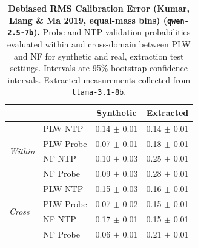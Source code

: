 \begin{table}[ht]
\centering
\begin{tabular}{ll cc}
\toprule
& & Synthetic & Extracted \\
\midrule
\multirow{4}{*}{\textit{Within}}
& PLW NTP & 0.14 $\pm$ 0.01 & 0.14 $\pm$ 0.01 \\
& PLW Probe & 0.07 $\pm$ 0.01 & 0.18 $\pm$ 0.01 \\
& NF NTP & 0.10 $\pm$ 0.03 & 0.25 $\pm$ 0.01 \\
& NF Probe & 0.09 $\pm$ 0.03 & 0.28 $\pm$ 0.01 \\
\midrule
\multirow{4}{*}{\textit{Cross}}
& PLW NTP & 0.15 $\pm$ 0.03 & 0.16 $\pm$ 0.01 \\
& PLW Probe & 0.07 $\pm$ 0.02 & 0.15 $\pm$ 0.01 \\
& NF NTP & 0.17 $\pm$ 0.01 & 0.15 $\pm$ 0.01 \\
& NF Probe & 0.06 $\pm$ 0.01 & 0.21 $\pm$ 0.01 \\
\bottomrule
\end{tabular}
\caption{\textbf{Debiased RMS Calibration Error (Kumar, Liang \& Ma 2019, equal-mass bins) (\texttt{qwen-2.5-7b}).} Probe and NTP validation probabilities evaluated within and cross-domain between PLW and NF for synthetic and real, extraction test settings. Intervals are 95\% bootstrap confidence intervals. Extracted measurements collected from \texttt{llama-3.1-8b}.}
\label{tab:qwen-2.5-7b-llama-3.1-8b-pond_nfix-rmsce_db}
\end{table}
